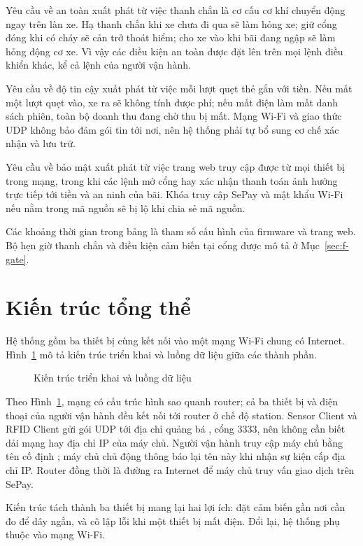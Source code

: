 Yêu cầu về an toàn xuất phát từ việc thanh chắn là cơ cấu cơ khí chuyển động ngay trên làn xe.
Hạ thanh chắn khi xe chưa đi qua sẽ làm hỏng xe; giữ cổng đóng khi có cháy sẽ cản trở thoát
hiểm; cho xe vào khi bãi đang ngập sẽ làm hỏng động cơ xe. Vì vậy các điều kiện an toàn được đặt
lên trên mọi lệnh điều khiển khác, kể cả lệnh của người vận hành.

Yêu cầu về độ tin cậy xuất phát từ việc mỗi lượt quẹt thẻ gắn với tiền. Nếu mất một lượt quẹt
vào, xe ra sẽ không tính được phí; nếu mất điện làm mất danh sách phiên, toàn bộ doanh thu đang
chờ thu bị mất. Mạng Wi-Fi và giao thức UDP không bảo đảm gói tin tới nơi, nên hệ thống phải tự
bổ sung cơ chế xác nhận và lưu trữ.

Yêu cầu về bảo mật xuất phát từ việc trang web truy cập được từ mọi thiết bị trong mạng, trong
khi các lệnh mở cổng hay xác nhận thanh toán ảnh hưởng trực tiếp tới tiền và an ninh của bãi.
Khóa truy cập SePay và mật khẩu Wi-Fi nếu nằm trong mã nguồn sẽ bị lộ khi chia sẻ mã nguồn.

Các khoảng thời gian trong bảng là tham số cấu hình của firmware và trang web. Bộ hẹn giờ thanh chắn và điều kiện cảm biến tại cổng được mô tả ở Mục~\ref{sec:f-gate}.

\section{Kiến trúc tổng thể}\label{sec:trienkhai}
Hệ thống gồm ba thiết bị cùng kết nối vào một mạng Wi-Fi chung có Internet. Hình~\ref{fig:deploy}
mô tả kiến trúc triển khai và luồng dữ liệu giữa các thành phần.

\begin{figure}[!htb]
\centering
{}
\caption{Kiến trúc triển khai và luồng dữ liệu}\label{fig:deploy}
\end{figure}

Theo Hình~\ref{fig:deploy}, mạng có cấu trúc hình sao quanh router; cả ba thiết bị và điện
thoại của người vận hành đều kết nối tới router ở chế độ station. Sensor Client và RFID Client gửi gói UDP tới địa chỉ quảng bá
, cổng 3333, nên không cần biết dải mạng hay địa chỉ IP của máy chủ.
Người vận hành truy cập máy chủ bằng tên cố định ; máy chủ chủ động thông
báo lại tên này khi nhận sự kiện cấp địa chỉ IP. Router đồng thời là đường ra Internet để máy chủ truy vấn giao dịch trên SePay.

Kiến trúc tách thành ba thiết bị mang lại hai lợi ích: đặt cảm biến gần nơi cần đo để dây
ngắn, và cô lập lỗi khi một thiết bị mất điện. Đổi lại, hệ thống phụ thuộc vào mạng Wi-Fi.

